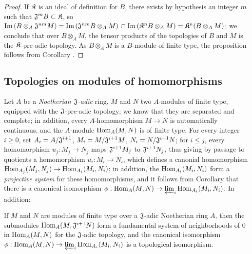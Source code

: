 \begin{proof}
\label{proof-0.7.7.8}
If $\mathfrak{K}$ is an ideal of definition for $B$, there exists by hypothesis an integer $m$ such that $\mathfrak{J}^m B\subset\mathfrak{K}$, so ${\mathop{\mathrm{Im}}\nolimits}\,(B\otimes_A\mathfrak{J}^{nm}M)={\mathop{\mathrm{Im}}\nolimits}\,(\mathfrak{J}^{nm}B\otimes_A M)\subset{\mathop{\mathrm{Im}}\nolimits}\,(\mathfrak{K}^n B\otimes_A M)=\mathfrak{K}^n(B\otimes_A M)$;
we conclude that over $B\otimes_A M$, the tensor products of the topologies of $B$ and $M$ is the $\mathfrak{K}$-pre-adic topology.
As $B\otimes_A M$ is a $B$-module of finite type, the proposition follows from Corollary .
\end{proof}

\subsection{Topologies on modules of homomorphisms}
\label{subsection-topologies-on-hom-modules}

\begin{env}[7.8.1]
\label{0.7.8.1}
Let $A$ be a \emph{Noetherian $\mathfrak{J}$-adic} ring, $M$ and $N$ two $A$-modules of finite type,
equipped with the $\mathfrak{J}$-pre-adic topology; we know  that they are
separated and complete; in addition, every $A$-homomorphism $M\to N$ is automatically continuous, and
the $A$-module ${\mathop{\mathrm{Hom}}\nolimits}_A(M,N)$ is of finite type. For every integer $i\geqslant 0$, set
$A_i=A/\mathfrak{J}^{i+1}$, $M_i=M/\mathfrak{J}^{i+1}M$, $N_i=N/\mathfrak{J}^{i+1}N$; for
$i\leqslant j$, every homomorphism $u_j:M_j\to N_j$ maps $\mathfrak{J}^{i+1}M_j$ to
$\mathfrak{J}^{i+1}N_j$, thus giving by passage to quotients a homomorphism $u_i:M_i\to N_i$, which
defines a canonial homomorphism $\Hom_{A_j}(M_j,N_j)\to\Hom_{A_i}(M_i,N_i)$; in addition, the
${\mathop{\mathrm{Hom}}\nolimits}_{A_i}(M_i,N_i)$ form a \emph{projective system} for these homomorphisms, and it follows from
Corollary  that there is a canonical isomorphism
$\vphi:\Hom_A(M,N)\to\varprojlim_i\Hom_{A_i}(M_i,N_i)$.
In addition:
\end{env}

\begin{prop}[7.8.2]
\label{0.7.8.2}
If $M$ and $N$ are modules of finite type over a $\mathfrak{J}$-adic Noetherian ring $A$, then the
submodules ${\mathop{\mathrm{Hom}}\nolimits}_A(M,\mathfrak{J}^{i+1}N)$ form a fundamental system of neighborhoods of $0$ in
${\mathop{\mathrm{Hom}}\nolimits}_A(M,N)$ for the $\mathfrak{J}$-adic topology, and the canonical isomorphism
$\vphi:\Hom_A(M,N)\to\varprojlim_i\Hom_{A_i}(M_i,N_i)$ is a topological isomorphism.
\end{prop}

